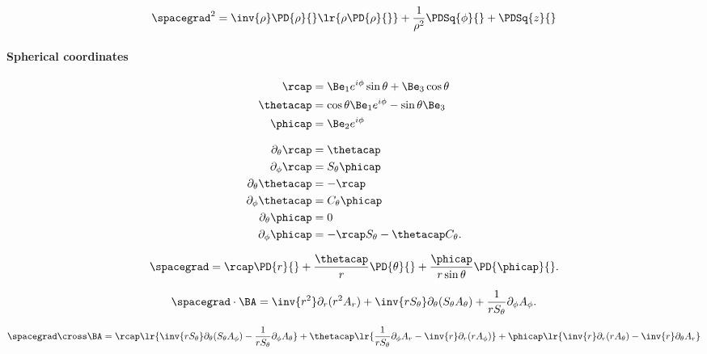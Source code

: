 \begin{dmath}\label{eqn:usefulFormulas:820}
\spacegrad^2
=
\inv{\rho} \PD{\rho}{} \lr{ \rho \PD{\rho}{} }
+ \frac{1}{\rho^2} \PDSq{\phi}{}
+ \PDSq{z}{}
\end{dmath}

\paragraph{Spherical coordinates}

\begin{dmath}\label{eqn:usefulFormulas:840}
\begin{aligned}
\rcap &= \Be_1 e^{i\phi} \sin\theta + \Be_3 \cos\theta \\
\thetacap &= \cos\theta \Be_1 e^{i\phi} - \sin\theta \Be_3 \\
\phicap &= \Be_2 e^{i\phi}
\end{aligned}
\end{dmath}

\begin{dmath}\label{eqn:usefulFormulas:860}
\begin{aligned}
\partial_{\theta}{\rcap}      &= \thetacap \\
\partial_{\phi}{\rcap}        &= S_\theta \phicap \\
\partial_{\theta}{\thetacap}  &= -\rcap \\
\partial_{\phi}{\thetacap}    &= C_\theta \phicap \\
\partial_{\theta}{\phicap}    &= 0 \\
\partial_{\phi}{\phicap}      &= -\rcap S_\theta - \thetacap C_\theta.
\end{aligned}
\end{dmath}

\begin{dmath}\label{eqn:usefulFormulas:880}
\spacegrad
=
\rcap \PD{r}{} +
\frac{\thetacap}{r} \PD{\theta}{} +
\frac{\phicap}{r\sin\theta} \PD{\phicap}{}.
\end{dmath}

\begin{dmath}\label{eqn:usefulFormulas:900}
\spacegrad \cdot \BA
=
\inv{r^2} \partial_r (r^2 A_r)
+ \inv{r S_\theta} \partial_\theta (S_\theta A_\theta)
+ \frac{1}{r S_\theta} \partial_\phi A_\phi.
\end{dmath}

\begin{dmath}\label{eqn:usefulFormulas:920}
\spacegrad \cross \BA
=
   \rcap \lr{
       \inv{r S_\theta} \partial_\theta (S_\theta A_\phi)
      -\frac{1}{r S_\theta} \partial_\phi A_\theta
   }
   + \thetacap \lr{
      \frac{1}{r S_\theta} \partial_\phi A_r
      -\inv{r} \partial_r (r A_\phi)
   }
   + \phicap \lr{
        \inv{r} \partial_r (r A_\theta)
      - \inv{r} \partial_\theta A_r
   }
\end{dmath}

